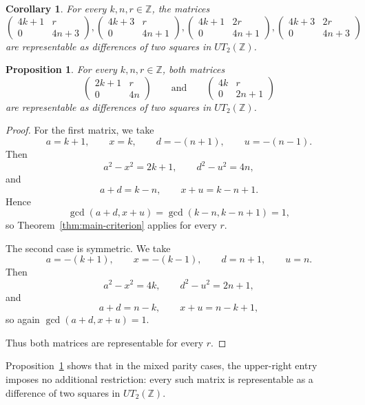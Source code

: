 \documentclass[11pt]{amsart}
\newtheorem{corollary}[theorem]{Corollary}
\newtheorem{proposition}[theorem]{Proposition}
\def\Z{\mathbb{Z}}
\begin{document}
\begin{corollary}
    For every $k,n,r\in\mathbb Z$,  the matrices 
    $$ \begin{pmatrix}4k+1&r\\0&4n+3\end{pmatrix},
    \begin{pmatrix}4k+3&r\\0&4n+1\end{pmatrix},
    \begin{pmatrix}4k+1&2r\\0&4n+1\end{pmatrix},
    \begin{pmatrix}4k+3&2r\\0&4n+3\end{pmatrix}$$
    are representable as differences of two squares in $UT_2(\Z)$.
\end{corollary}




\begin{proposition}\label{prop:mixed-cases}
For every $k,n,r\in\mathbb Z$, both matrices
\[
\begin{pmatrix}2k+1&r\\0&4n\end{pmatrix}
\qquad\text{and}\qquad
\begin{pmatrix}4k&r\\0&2n+1\end{pmatrix}
\]
are representable as differences of two squares in $UT_2(\Z)$.
\end{proposition}

\begin{proof}
For the first matrix, we take
$$a=k+1,\qquad x=k, \qquad d=-(n+1), \qquad u=-(n-1).$$
Then
$$a^2-x^2=2k+1,
\qquad d^2-u^2=4n,$$ 
and
$$a+d=k-n,\qquad x+u=k-n+1. $$
Hence
$$\gcd(a+d,x+u)=\gcd(k-n,k-n+1)=1,$$
so Theorem~\ref{thm:main-criterion} applies for every $r$.

The second case is symmetric. We take
$$a=-(k+1), \qquad x=-(k-1), \qquad d=n+1, \qquad u=n.$$
Then
$$a^2-x^2=4k, \qquad d^2-u^2=2n+1,$$
and
$$a+d=n-k,\qquad x+u=n-k+1,$$
so again $\gcd(a+d,x+u)=1$.

Thus both matrices are representable for every $r$.
\end{proof}

Proposition~\ref{prop:mixed-cases} shows that in the mixed parity cases, the upper-right entry imposes no additional restriction: every such matrix is representable as a difference of two squares in $UT_2(\mathbb Z)$.
\end{document}
